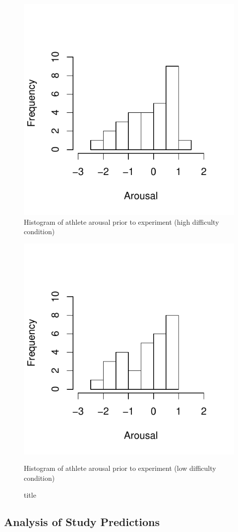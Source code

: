 \begin{figure}
  \centering
      \includegraphics[width=0.5\linewidth,keepaspectratio] {images/histArousalFactorPreHigh-1}
      \caption{Histogram of athlete arousal prior to experiment (high difficulty condition)}
        \label{fig:histArousalFactorPreHigh}
    \end{figure}

\begin{figure}
  \centering
  \includegraphics[width=0.5\linewidth,keepaspectratio] {images/histArousalFactorPreLow-1}
      \caption{Histogram of athlete arousal prior to experiment (low difficulty condition)}
  \caption{title}
    \label{fig:histArousalFactorPreLow}
\end{figure}












\subsection{Analysis of Study Predictions\label{app9:analysisStudyPredictions}}





